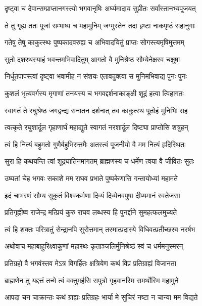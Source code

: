 \twolineshloka
{दृष्ट्वा च देवान्सम्प्राप्तानगस्त्यो भगवानृषिः}
{अर्घ्यमादाय सुप्रीतः सर्वांस्तानभ्यपूजयत्}%

\twolineshloka
{ते तु गृह्य ततः पूजां सम्भाष्य च महामुनिम्}
{जग्मुस्तेन तदा हृष्टा नाकपृष्ठं सहानुगाः}%

\twolineshloka
{गतेषु तेषु काकुत्स्थः पुष्पकादवरुह्य च}
{अभिवादयितुं प्राप्तः सोगस्त्यमृषिमुत्तमम्}%


\twolineshloka
{सुतो दशरथस्याहं भवन्तमभिवादितुम्}
{आगतो वै मुनिश्रेष्ठ सौम्येनेक्षस्व चक्षुषा}%

\twolineshloka
{निर्धूतपापस्त्वां दृष्ट्वा भवामीह न संशयः}
{एतावदुक्त्वा स मुनिमभिवाद्य पुनः पुनः}%

\twolineshloka
{कुशलं भृत्यवर्गस्य मृगाणां तनयस्य च}
{भगवद्दर्शनाकाङ्क्षी शूद्रं हत्वा त्विहागतः}%


\twolineshloka
{स्वागतं ते रघुश्रेष्ठ जगद्वन्द्य सनातन}
{दर्शनात् तव काकुत्स्थ पूतोहं मुनिभिः सह}%

\twolineshloka
{त्वत्कृते रघुशार्दूल गृहाणार्घं महाद्युते}
{स्वागतं नरशार्दूल दिष्ट्या प्राप्तोसि शत्रुहन्}%

\twolineshloka
{त्वं हि नित्यं बहुमतो गुणैर्बहुभिरुत्तमैः}
{अतस्त्वं पूजनीयो वै मम नित्यं हृदिस्थितः}%

\twolineshloka
{सुरा हि कथयन्ति त्वां शूद्रघातिनमागतम्}
{ब्राह्मणस्य च धर्मेण त्वया वै जीवितः सुतः}%

\twolineshloka
{उष्यतां चेह भगवः सकाशे मम राघव}
{प्रभाते पुष्पकेणासि गन्तायोध्यां महामते}%

\twolineshloka
{इदं चाभरणं सौम्य सुकृतं विश्वकर्मणा}
{दिव्यं दिव्येनवपुषा दीप्यमानं स्वतेजसा}%

\twolineshloka
{प्रतिगृह्णीष्व राजेन्द्र मत्प्रियं कुरु राघव}
{लब्धस्य हि पुनर्द्दाने सुमहत्फलमुच्यते}%

\twolineshloka
{त्वं हि शक्तः परित्रातुं सेन्द्रानपि सुरोत्तमान्}
{तस्मात्प्रदास्ये विधिवत्प्रतीच्छस्व नरर्षभ}%

\twolineshloka
{अथोवाच महाबाहुरिक्ष्वाकूणां महारथः}
{कृताञ्जलिर्मुनिश्रेष्ठं स्वं च धर्ममनुस्मरन्}%

\twolineshloka
{प्रतिग्रहो वै भगवंस्तव मेऽत्र विगर्हितः}
{क्षत्रियेण कथं विप्र प्रतिग्राह्यं विजानता}%

\twolineshloka
{ब्राह्मणेन तु यद्दत्तं तन्मे त्वं वक्तुमर्हसि}
{सपुत्रो गृहवानस्मि समर्थोस्मि महामुने}%

\twolineshloka
{आपदा चन चाक्रान्तः कथं ग्राह्यः प्रतिग्रहः}
{भार्या मे सुचिरं नष्टा न चान्या मम विद्यते}%

